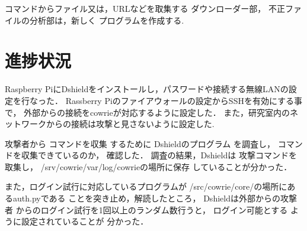 \documentclass{entry}
\begin{document}
コマンドからファイル又は，URLなどを取集する
ダウンローダー部，
不正ファイルの分析部は，新しく
プログラムを作成する.


\section{進捗状況}

Raspberry PiにDshieldをインストールし，パスワードや接続する無線LANの設定を行なった．
Rassberry Piのファイアウォールの設定からSSHを有効にする事で，
外部からの接続をcowrieが対応するように設定した．
また，研究室内のネットワークからの接続は攻撃と見さないように設定した.


攻撃者から
コマンドを収集
するために
Dshieldのプログラム
を調査し，
コマンドを収集できているのか，
確認した．
調査の結果，Dshieldは
攻撃コマンドを取集し，
/srv/cowrie/var/log/cowrieの場所に保存
していることが分かった．

また，ログイン試行に対応しているプログラムが
/src/cowrie/core/の場所にあるauth.pyである
ことを突き止め，解読したところ，
Dshieldは外部からの攻撃者
からのログイン試行を1回以上のランダム数行うと，
ログイン可能とする
ように設定されていることが
分かった．

\end{document}
